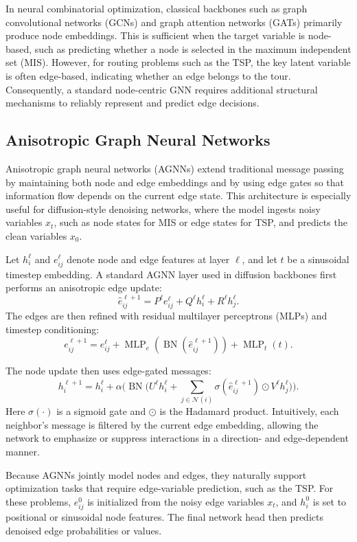 In neural combinatorial optimization, classical backbones such as graph convolutional
networks (GCNs) \citep{kipf2016semi} and graph attention networks (GATs)
\citep{velickovic2017graph} primarily produce node embeddings. This is sufficient when the
target variable is node-based, such as predicting whether a node is selected in the maximum
independent set (MIS). However, for routing problems such as the TSP, the key latent variable
is often edge-based, indicating whether an edge belongs to the tour. Consequently, a standard
node-centric GNN requires additional structural mechanisms to reliably represent and predict
edge decisions.

\subsection{Anisotropic Graph Neural Networks}
\label{subsec:agnn}

Anisotropic graph neural networks (AGNNs) extend traditional message passing by maintaining
both node and edge embeddings and by using edge gates so that information flow depends on the
current edge state. This architecture is especially useful for diffusion-style denoising
networks, where the model ingests noisy variables $x_t$, such as node states for MIS or edge
states for TSP, and predicts the clean variables $x_0$.

Let $h_i^{\ell}$ and $e_{ij}^{\ell}$ denote node and edge features at layer $\ell$, and let
$t$ be a sinusoidal timestep embedding. A standard AGNN layer used in diffusion backbones
first performs an anisotropic edge update:
\[
\hat{e}_{ij}^{\ell+1}=P^{\ell}e_{ij}^{\ell}+Q^{\ell}h_i^{\ell}+R^{\ell}h_j^{\ell}.
\]
The edges are then refined with residual multilayer perceptrons (MLPs) and timestep
conditioning:
\[
e_{ij}^{\ell+1}
=e_{ij}^{\ell}+\operatorname{MLP}_e(\operatorname{BN}(\hat{e}_{ij}^{\ell+1}))
+\operatorname{MLP}_t(t).
\]

The node update then uses edge-gated messages:
\[
h_i^{\ell+1}=h_i^{\ell}+\alpha\Big(
\operatorname{BN}\big(U^{\ell}h_i^{\ell}
+\sum_{j\in\mathcal{N}(i)}
\sigma(\hat{e}_{ij}^{\ell+1})\odot V^{\ell}h_j^{\ell}\big)\Big).
\]
Here $\sigma(\cdot)$ is a sigmoid gate and $\odot$ is the Hadamard product. Intuitively, each
neighbor's message is filtered by the current edge embedding, allowing the network to
emphasize or suppress interactions in a direction- and edge-dependent manner.

Because AGNNs jointly model nodes and edges, they naturally support optimization tasks that
require edge-variable prediction, such as the TSP. For these problems, $e_{ij}^{0}$ is
initialized from the noisy edge variables $x_t$, and $h_i^{0}$ is set to positional or
sinusoidal node features. The final network head then predicts denoised edge probabilities or
values.

